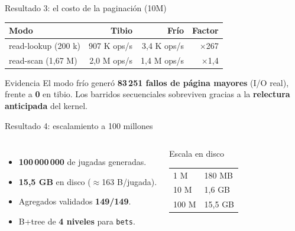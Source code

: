 \documentclass[aspectratio=169,11pt]{beamer}
\begin{document}
\begin{frame}{Resultado 3: el costo de la paginación (10M)}
  \begin{table}
    \centering
    \begin{tabular}{@{}lrrr@{}}
      \toprule
      \textbf{Modo} & \textbf{Tibio} & \textbf{Frío} & \textbf{Factor} \\
      \midrule
      read-lookup (200 k) & 907 K ops/s & 3{,}4 K ops/s & $\times$267 \\
      read-scan (1,67 M) & 2{,}0 M ops/s & 1{,}4 M ops/s & $\times$1{,}4 \\
      \bottomrule
    \end{tabular}
  \end{table}

  \vspace{0.3cm}
  \begin{block}{Evidencia}
    El modo frío generó \textbf{83\,251 fallos de página mayores} (I/O real),
    frente a \textbf{0} en tibio. Los barridos secuenciales sobreviven gracias
    a la \textbf{relectura anticipada} del kernel.
  \end{block}
\end{frame}

\begin{frame}{Resultado 4: escalamiento a 100 millones}
  \begin{columns}
      \begin{itemize}
        \item \textbf{100\,000\,000} de jugadas generadas.
        \item \textbf{15,5 GB} en disco ($\approx$163 B/jugada).
        \item Agregados validados \textbf{149/149}.
        \item B+tree de \textbf{4 niveles} para \texttt{bets}.
      \end{itemize}
      \begin{block}{Escala en disco}
        \centering
        \begin{tabular}{@{}ll@{}}
          1 M & 180 MB \\
          10 M & 1,6 GB \\
          100 M & 15,5 GB \\
        \end{tabular}
      \end{block}
  \end{columns}
\end{frame}
\end{document}
